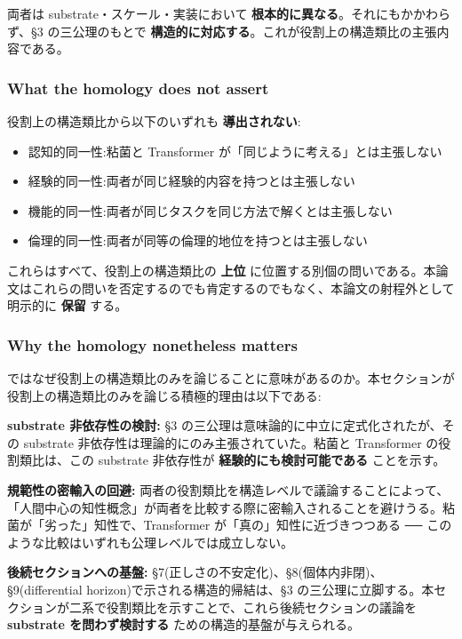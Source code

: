 両者は substrate・スケール・実装において \textbf{根本的に異なる}。それにもかかわらず、\S{}3 の三公理のもとで \textbf{構造的に対応する}。これが役割上の構造類比の主張内容である。

\subsubsection{What the homology does not assert}


役割上の構造類比から以下のいずれも \textbf{導出されない}:

\begin{itemize}
\item 認知的同一性:粘菌と Transformer が「同じように考える」とは主張しない
\item 経験的同一性:両者が同じ経験的内容を持つとは主張しない
\item 機能的同一性:両者が同じタスクを同じ方法で解くとは主張しない
\item 倫理的同一性:両者が同等の倫理的地位を持つとは主張しない
\end{itemize}

これらはすべて、役割上の構造類比の \textbf{上位} に位置する別個の問いである。本論文はこれらの問いを否定するのでも肯定するのでもなく、本論文の射程外として明示的に \textbf{保留} する。

\subsubsection{Why the homology nonetheless matters}


ではなぜ役割上の構造類比のみを論じることに意味があるのか。本セクションが役割上の構造類比のみを論じる積極的理由は以下である:

\textbf{substrate 非依存性の検討:}
\S{}3 の三公理は意味論的に中立に定式化されたが、その substrate 非依存性は理論的にのみ主張されていた。粘菌と Transformer の役割類比は、この substrate 非依存性が \textbf{経験的にも検討可能である} ことを示す。

\textbf{規範性の密輸入の回避:}
両者の役割類比を構造レベルで議論することによって、「人間中心の知性概念」が両者を比較する際に密輸入されることを避けうる。粘菌が「劣った」知性で、Transformer が「真の」知性に近づきつつある ── このような比較はいずれも公理レベルでは成立しない。

\textbf{後続セクションへの基盤:}
\S{}7(正しさの不安定化)、\S{}8(個体内非閉)、\S{}9(differential horizon)で示される構造的帰結は、\S{}3 の三公理に立脚する。本セクションが二系で役割類比を示すことで、これら後続セクションの議論を \textbf{substrate を問わず検討する} ための構造的基盤が与えられる。

